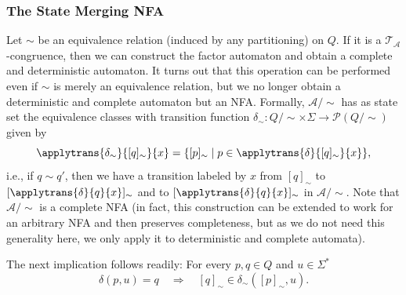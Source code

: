 






\subsubsection{The State Merging NFA}





Let $\sim$ be an equivalence relation (induced by any partitioning) on $Q$.
If it is a $\mathcal T_{\mathcal A}$-congruence, then we can construct
the factor automaton and obtain a complete and deterministic automaton.
It turns out that this operation can be performed even if $\sim$
is merely an equivalence relation, but we no longer obtain a deterministic and complete
automaton but an NFA. Formally, $\mathcal A / {\sim}$ 
has as state set the equivalence classes with transition function
$\delta_{\sim} \colon Q / {\sim} \times \Sigma \to \mathcal P(Q / {\sim})$ given by
\[
 \applytrans{\delta_{\sim}}{[q]_{\sim}}{x} 
 = \{ [p]_{\sim} \mid p \in \applytrans{\delta}{[q]_{\sim}}{x}\}, 
\]
i.e., if $q \sim q'$, then 
we have a transition labeled by $x$ from $[q]_{\sim}$
to $[\applytrans{\delta}{q}{x}]_{\sim}$
and to $[\applytrans{\delta}{q}{x}]_{\sim}$ in $\mathcal A/{\sim}$.
Note that $\mathcal A /{\sim}$ is a complete NFA (in fact, this construction
can be extended to work for an arbitrary NFA and then preserves completeness,
but as we do not need this generality here, we only apply it to 
deterministic and complete automata).

The next implication follows readily: For every $p, q \in Q$ and $u \in \Sigma^*$ 
\begin{equation}
\label{constr_sync:eqn:general_factor_transition}
 \delta(p, u) = q \quad\Rightarrow\quad 
 [q]_{\sim} \in \delta_{\sim}([p]_{\sim}, u).
\end{equation}

